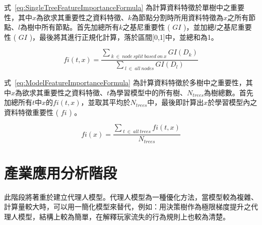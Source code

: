 式~\ref{eq:SingleTreeFeatureImportanceFormula} 為計算資料特徵於單樹中之重要性，其中$x$為欲求其重要性之資料特徵、$k$為節點分割時所用資料特徵為$x$之所有節點、$l$為樹中所有節點。首先加總所有$k$之基尼重要性 ( $GI$ )，並加總$l$之基尼重要性 ( $GI$ )，最後將其進行正規化計算，落於區間[0,1]中，並總和為1。

\begin{equation}
  \label{eq:SingleTreeFeatureImportanceFormula}
  fi(t,x) = \frac{\sum_{\ k\ \in\ node\ split\ based\ on\ x}GI(D_k)}{\sum_{\ l\ \in\ all\ nodes}GI(D_l)}
\end{equation}

式~\ref{eq:ModelFeatureImportanceFormula} 為計算資料特徵於多樹中之重要性，其中$x$為欲求其重要性之資料特徵、$t$為學習模型中的所有樹、$N_{trees}$為樹總數。首先加總所有$t$中$x$的$fi(t,x)$，並取其平均於$N_{trees}$中，最後即計算出$x$於學習模型內之資料特徵重要性 ( $fi$ ) 。

\begin{equation}
  \label{eq:ModelFeatureImportanceFormula}
  fi(x) = \frac{\sum_{\ t\ \in\ all\ trees}fi(t,x)}{N_{trees}}
\end{equation}

\section{產業應用分析階段}

此階段將著重於建立代理人模型。代理人模型為一種優化方法，當模型較為複雜、計算量較大時，可以用一簡化模型來替代，例如：用決策樹作為極限梯度提升之代理人模型，結構上較為簡單，在解釋玩家流失的行為規則上也較為清楚。
\newpage
